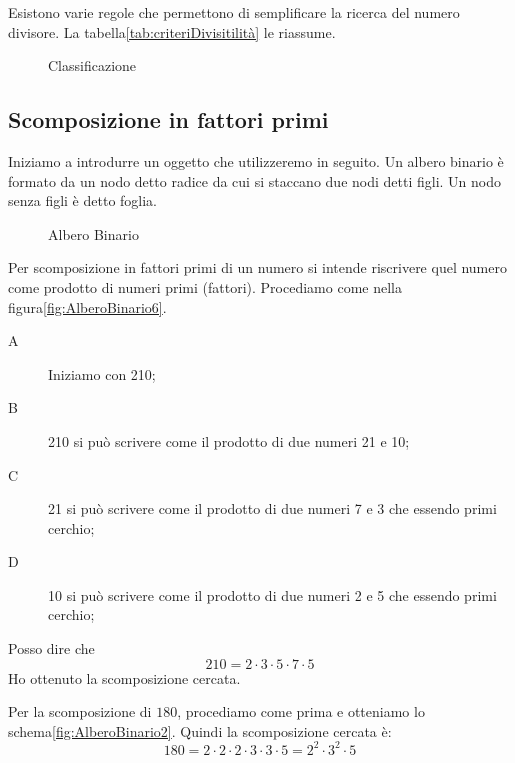 Esistono varie regole che permettono di semplificare la ricerca del numero divisore. La tabella\nobs\vref{tab:criteriDivisitilità} le riassume.
\begin{figure} %
	\centering

	\caption{Classificazione}
	\label{fig:ProprietaClassificazioneNumNat}
\end{figure}
\subsection{Scomposizione in fattori primi}
Iniziamo a introdurre un oggetto che utilizzeremo in seguito. Un albero binario è formato da un nodo detto radice da cui si staccano due nodi detti figli. Un nodo senza figli è detto foglia.  
\begin{figure} %
	\centering

	\caption{Albero Binario}
	\label{fig:AlberoBinarioDef}
\end{figure}

Per scomposizione in fattori primi  di un numero si intende riscrivere quel numero come prodotto di numeri primi (fattori). Procediamo come nella figura\nobs\vref{fig:AlberoBinario6}. 
\begin{description}
\item[A] Iniziamo con \num{210};
\item[B] \num{210} si può scrivere come il prodotto di due numeri \num{21} e \num{10};
\item[C] \num{21} si può scrivere come il prodotto di due numeri \num{7} e \num{3} che essendo primi cerchio;
\item[D] \num{10} si può scrivere come il prodotto di due numeri \num{2} e \num{5} che essendo primi cerchio;
\end{description}
Posso dire che \[210=2\cdot 3\cdot 5 \cdot 7 \cdot5 \]Ho ottenuto la scomposizione cercata.

Per la scomposizione di $180$, procediamo come prima e otteniamo lo schema\nobs\vref{fig:AlberoBinario2}. Quindi la scomposizione cercata è:
\[180=2\cdot 2\cdot 2\cdot 3\cdot 3\cdot 5=2^2\cdot 3^2\cdot 5 \]    

